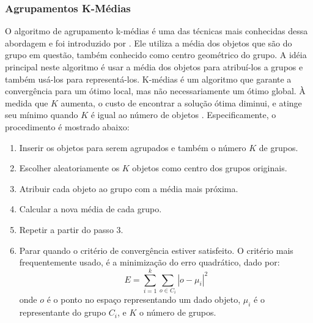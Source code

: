 \subsubsection{Agrupamentos K-Médias}
O algoritmo de agrupamento k-médias é uma das técnicas mais conhecidas dessa abordagem e foi introduzido por \cite{Macqueen67}. Ele utiliza a média dos objetos que são do grupo em questão, também conhecido como centro geométrico do grupo. A idéia principal neste algoritmo é usar a média dos objetos para atribuí-los a grupos e também usá-los para  representá-los.
K-médias é um algoritmo que garante a convergência para um ótimo local, mas não necessariamente um ótimo global. À medida que ${K}$ aumenta, o custo de encontrar a solução ótima diminui, e atinge seu mínimo quando ${K}$ é igual ao número de objetos \cite{Wu2008}. Especificamente, o procedimento é mostrado abaixo:
 \begin{enumerate}
	\item Inserir os objetos para serem agrupados e também o número ${K}$ de grupos.
	\item Escolher aleatoriamente os ${K}$ objetos como centro dos grupos originais.
	\item Atribuir cada objeto ao grupo com a média mais próxima.
	\item Calcular a nova média de cada grupo.
	\item Repetir a partir do passo 3.
	\item Parar quando o critério de convergência estiver satisfeito. O critério mais frequentemente usado, é a minimização do erro quadrático, dado por: 
	\begin{equation}
	E = \sum_{i=1}^{k}\sum_{o\in C_{i}} |o - \mu_{i}|^{2}
	\end{equation}
	onde ${o}$ é o ponto no espaço representando um dado objeto, ${\mu_{i}}$ é o representante do grupo ${C_{i}}$,
	 e ${K}$ o número de grupos.
\end{enumerate}

